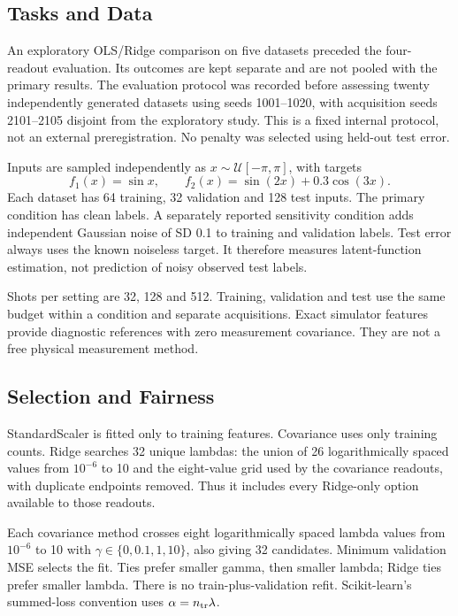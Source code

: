 \documentclass[conference]{IEEEtran}
\begin{document}
\subsection{Tasks and Data}
An exploratory OLS/Ridge comparison on five datasets preceded the four-readout evaluation. Its outcomes are kept separate and are not pooled with the primary results. The evaluation protocol was recorded before assessing twenty independently generated datasets using seeds 1001--1020, with acquisition seeds 2101--2105 disjoint from the exploratory study. This is a fixed internal protocol, not an external preregistration. No penalty was selected using held-out test error.

Inputs are sampled independently as $x\sim\mathcal U[-\pi,\pi]$, with targets
\begin{equation}
f_1(x)=\sin x,\qquad f_2(x)=\sin(2x)+0.3\cos(3x).
\end{equation}
Each dataset has 64 training, 32 validation and 128 test inputs. The primary condition has clean labels. A separately reported sensitivity condition adds independent Gaussian noise of SD 0.1 to training and validation labels. Test error always uses the known noiseless target. It therefore measures latent-function estimation, not prediction of noisy observed test labels.

Shots per setting are 32, 128 and 512. Training, validation and test use the same budget within a condition and separate acquisitions. Exact simulator features provide diagnostic references with zero measurement covariance. They are not a free physical measurement method.

\subsection{Selection and Fairness}
StandardScaler is fitted only to training features. Covariance uses only training counts. Ridge searches 32 unique lambdas: the union of 26 logarithmically spaced values from $10^{-6}$ to 10 and the eight-value grid used by the covariance readouts, with duplicate endpoints removed. Thus it includes every Ridge-only option available to those readouts.

Each covariance method crosses eight logarithmically spaced lambda values from $10^{-6}$ to 10 with $\gamma\in\{0,0.1,1,10\}$, also giving 32 candidates. Minimum validation MSE selects the fit. Ties prefer smaller gamma, then smaller lambda; Ridge ties prefer smaller lambda. There is no train-plus-validation refit. Scikit-learn's summed-loss convention uses $\alpha=n_{\rm tr}\lambda$.
\end{document}
